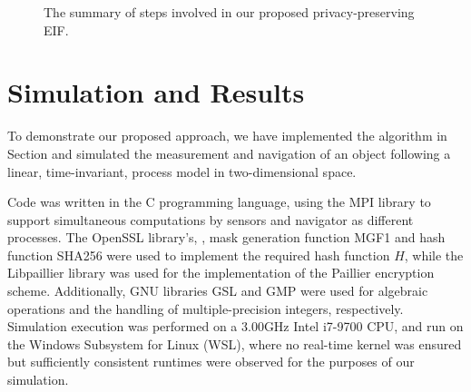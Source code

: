 \documentclass[10pt,letterpaper,oneside,twocolumn,journal]{IEEEtran}
\theoremstyle{definition}
\theoremstyle{definition}
\theoremstyle{remark}
\begin{document}
\begin{figure}[htbp]
\caption{The summary of steps involved in our proposed privacy-preserving EIF.}
\vspace{-\baselineskip}
\label{fig:alg_steps}
\end{figure}

% 
%                                 
%                                 
%                                 
% 

\section{Simulation and Results} \label{sec:sim_and_results}
To demonstrate our proposed approach, we have implemented the algorithm in Section  and simulated the measurement and navigation of an object following a linear, time-invariant, process model in two-dimensional space. 

Code was written in the C programming language, using the MPI library \cite{theopenmpiprojectOpenMPI2020} to support simultaneous computations by sensors and navigator as different processes. The OpenSSL library's, \cite{theopensslprojectOpenSSL2020}, mask generation function MGF1 and hash function SHA256 were used to implement the required hash function $H$, while the Libpaillier library \cite{bethencourtLibpaillier2010} was used for the implementation of the Paillier encryption scheme. Additionally, GNU libraries GSL \cite{thegsldevelopmentteamGSLGNUScientific2019} and GMP \cite{granlundGMPGNUMultiple2020} were used for algebraic operations and the handling of multiple-precision integers, respectively. Simulation execution was performed on a 3.00GHz Intel i7-9700 CPU, and run on the Windows Subsystem for Linux (WSL), where no real-time kernel was ensured but sufficiently consistent runtimes were observed for the purposes of our simulation.
\end{document}
